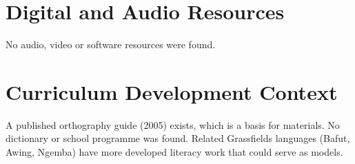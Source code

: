 \documentclass[12pt]{article}
\begin{document}
\section{Digital and Audio Resources}
No audio, video or software resources were found.

\section{Curriculum Development Context}
A published orthography guide (2005) exists, which is a basis for materials. No dictionary or school programme was found. Related Grassfields languages (Bafut, Awing, Ngemba) have more developed literacy work that could serve as models.
\end{document}
